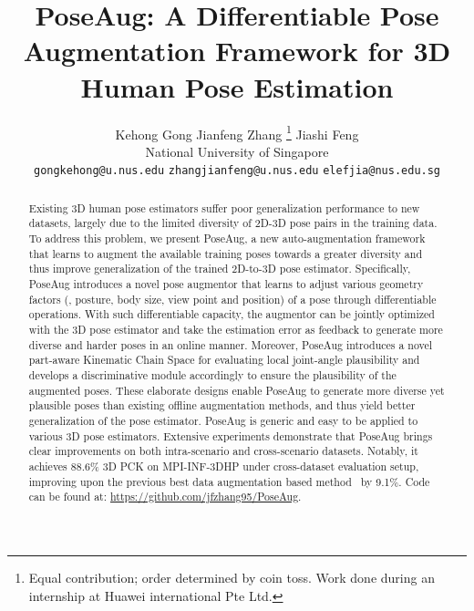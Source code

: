 \documentclass[final]{cvpr}
\begin{document}
\title{PoseAug: A Differentiable Pose Augmentation Framework for 3D Human Pose Estimation}

\author{
Kehong Gong    \footnotemark[1]  \qquad
Jianfeng Zhang \thanks{Equal contribution; order determined by coin toss. Work done during an internship at Huawei international Pte Ltd.}   \qquad
Jiashi Feng \\
National University of Singapore\\
\small \texttt{gongkehong@u.nus.edu} \quad \texttt{zhangjianfeng@u.nus.edu} \quad \texttt{elefjia@nus.edu.sg}
}

\maketitle


\begin{abstract}
Existing 3D human pose estimators suffer poor generalization performance to new datasets, largely due to the limited diversity of 2D-3D pose pairs in the training data.
To address this problem, we present PoseAug, a new auto-augmentation framework that learns to augment the available training poses towards a greater diversity and thus improve  generalization of the trained 2D-to-3D pose estimator. 
Specifically, PoseAug introduces a novel pose augmentor that learns to adjust various geometry factors (\eg, posture, body size, view point and position) of a pose through differentiable operations.
With such differentiable capacity, the augmentor can be jointly optimized with the 3D pose estimator and take the estimation error as  feedback to generate more diverse and harder poses in an online manner.  
Moreover, PoseAug introduces a novel part-aware Kinematic Chain Space for evaluating local joint-angle plausibility and develops a discriminative module accordingly to ensure the plausibility of the augmented poses. 
These elaborate designs enable PoseAug to generate more diverse yet plausible poses than existing offline augmentation methods, and thus yield better generalization of the pose estimator.  
PoseAug is generic and easy to be applied to various 3D pose estimators. 
Extensive experiments demonstrate that PoseAug  brings clear improvements on both intra-scenario and cross-scenario  datasets. 
Notably, it achieves 88.6\% 3D PCK on MPI-INF-3DHP under cross-dataset evaluation setup, improving upon the previous best data augmentation based method~\cite{Li_2020_CVPR} by 9.1\%. Code can be found at: \url{https://github.com/jfzhang95/PoseAug}.



\end{abstract}
\end{document}
